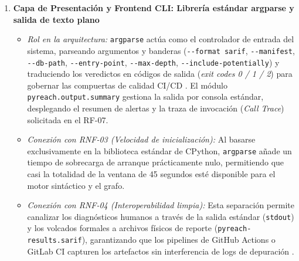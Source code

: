 \begin{enumerate}
    \item \textbf{Capa de Presentación y Frontend CLI: Librería estándar argparse y salida de texto plano}
    \begin{itemize}
        \item \textit{Rol en la arquitectura:} \texttt{argparse} actúa como el controlador de entrada del sistema, parseando argumentos y banderas (\texttt{-\allowbreak -\allowbreak format sarif}, \texttt{-\allowbreak -\allowbreak manifest}, \texttt{-\allowbreak -\allowbreak db-\allowbreak path}, \texttt{-\allowbreak -\allowbreak entry-\allowbreak point}, \texttt{-\allowbreak -\allowbreak max-\allowbreak depth}, \texttt{-\allowbreak -\allowbreak include-\allowbreak potentially}) y traduciendo los veredictos en códigos de salida (\textit{exit codes 0 / 1 / 2}) para gobernar las compuertas de calidad CI/CD \cite{humble2010continuous, wiegers2013software}. El módulo \texttt{pyreach.\allowbreak output.\allowbreak summary} gestiona la salida por consola estándar, desplegando el resumen de alertas y la traza de invocación (\textit{Call Trace}) solicitada en el RF-07.
        \item \textit{Conexión con RNF-03 (Velocidad de inicialización):} Al basarse exclusivamente en la biblioteca estándar de CPython, \texttt{argparse} añade un tiempo de sobrecarga de arranque prácticamente nulo, permitiendo que casi la totalidad de la ventana de 45 segundos esté disponible para el motor sintáctico y el grafo.
        \item \textit{Conexión con RNF-04 (Interoperabilidad limpia):} Esta separación permite canalizar los diagnósticos humanos a través de la salida estándar (\texttt{stdout}) y los volcados formales a archivos físicos de reporte (\texttt{pyreach-\allowbreak results.\allowbreak sarif}), garantizando que los pipelines de GitHub Actions o GitLab CI capturen los artefactos sin interferencia de logs de depuración \cite{oasis2019sarif}.
    \end{itemize}


\end{enumerate}
